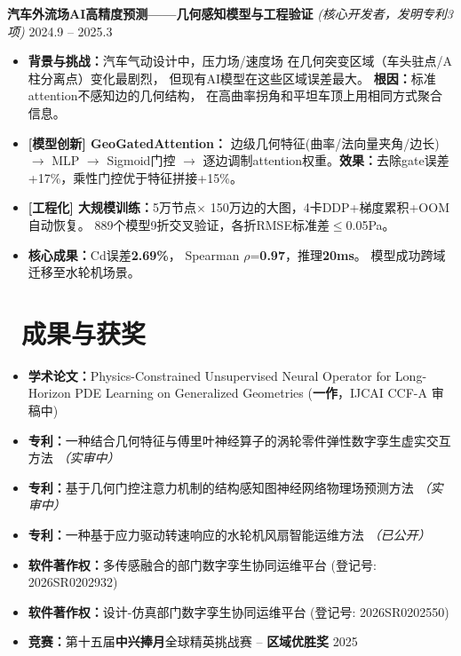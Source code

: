 \documentclass[11pt]{article}
\begin{document}
\textbf{汽车外流场AI高精度预测——几何感知模型与工程验证} 
\textit{(核心开发者，发明专利3项)} \hfill 2024.9 -- 2025.3
\begin{itemize}
    \item \textbf{背景与挑战：}汽车气动设计中，压力场/速度场
    在几何突变区域（车头驻点/A柱分离点）变化最剧烈，
    但现有AI模型在这些区域误差最大。
    \textbf{根因：}标准attention不感知边的几何结构，
    在高曲率拐角和平坦车顶上用相同方式聚合信息。

    \item \textbf{[模型创新] GeoGatedAttention：}
    边级几何特征(曲率/法向量夹角/边长) $\rightarrow$ 
    MLP $\rightarrow$ Sigmoid门控 $\rightarrow$ 
    逐边调制attention权重。\textbf{效果：}去除gate误差
    +17\%，乘性门控优于特征拼接+15\%。

    \item \textbf{[工程化] 大规模训练：}5万节点$\times$
    150万边的大图，4卡DDP+梯度累积+OOM自动恢复。
    889个模型9折交叉验证，各折RMSE标准差$\leq$0.05Pa。

    \item \textbf{核心成果：}Cd误差\textbf{2.69\%}，
    Spearman $\rho$=\textbf{0.97}，推理\textbf{20ms}。
    模型成功跨域迁移至水轮机场景。
\end{itemize}



\section{%
    \makebox[\widthof{\faTrophy}][c]%
    {\color{CVBlue}\faTrophy}\ 成果与获奖%
}

\begin{itemize}
    \item \textbf{学术论文：}Physics-Constrained Unsupervised Neural Operator for Long-Horizon PDE Learning on Generalized Geometries (\textbf{一作}，IJCAI CCF-A 审稿中)
    \item \textbf{专利：}一种结合几何特征与傅里叶神经算子的涡轮零件弹性数字孪生虚实交互方法 \textit{（实审中）}
    \item \textbf{专利：}基于几何门控注意力机制的结构感知图神经网络物理场预测方法 \textit{（实审中）}
    \item \textbf{专利：}一种基于应力驱动转速响应的水轮机风扇智能运维方法 \textit{（已公开）}
    \item \textbf{软件著作权：}多传感融合的部门数字孪生协同运维平台 (登记号: 2026SR0202932)
    \item \textbf{软件著作权：}设计-仿真部门数字孪生协同运维平台 (登记号: 2026SR0202550)
    \item \textbf{竞赛：}第十五届\textbf{中兴捧月}全球精英挑战赛 -- \textbf{区域优胜奖} \hfill 2025
\end{itemize}
\end{document}
